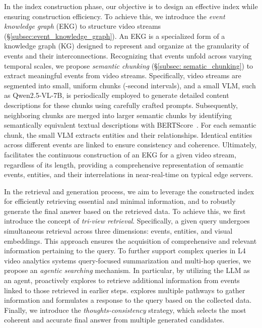 In the index construction phase, our objective is to design an effective index while ensuring construction efficiency. To achieve this, we introduce the \emph{event knowledge graph} (EKG) to structure video streams (\S\ref{subsec:event_knowledge_graph}). An EKG is a specialized form of a knowledge graph (KG) designed to represent and organize at the granularity of events and their interconnections. Recognizing that events unfold across varying temporal scales, we propose \emph{semantic chunking} (\S\ref{subsec: sematic_chunking}) to extract meaningful events from video streams. Specifically, video streams are segmented into small, uniform chunks (-second intervals), and a small VLM, such as Qwen2.5-VL-7B, is periodically employed to generate detailed content descriptions for these chunks using carefully crafted prompts. Subsequently, neighboring chunks are merged into larger semantic chunks by identifying semantically equivalent textual descriptions with BERTScore~\cite{devlin2019bert}. For each semantic chunk, the small VLM extracts entities and their relationships. Identical entities across different events are linked to ensure consistency and coherence. Ultimately, \sysname facilitates the continuous construction of an EKG for a given video stream, regardless of its length, providing a comprehensive representation of semantic events, entities, and their interrelations in near-real-time on typical edge servers.





In the retrieval and generation process, we aim to leverage the constructed index for efficiently retrieving essential and minimal information, and to robustly generate the final answer based on the retrieved data. To achieve this, we first introduce the concept of \emph{tri-view retrieval}. Specifically, a given query undergoes simultaneous retrieval across three dimensions: events, entities, and visual embeddings. This approach ensures the acquisition of comprehensive and relevant information pertaining to the query. To further support complex queries in L4 video analytics systems \eg query-focused summarization and multi-hop queries, we propose an \emph{agentic searching} mechanism. In particular, by utilizing the LLM as an agent, \sysname proactively explores to retrieve additional information from events linked to those retrieved in earlier steps. \sysname explores multiple pathways to gather information and formulates a response to the query based on the collected data. Finally, we introduce the \emph{thoughts-consistency} strategy, which selects the most coherent and accurate final answer from multiple generated candidates.




